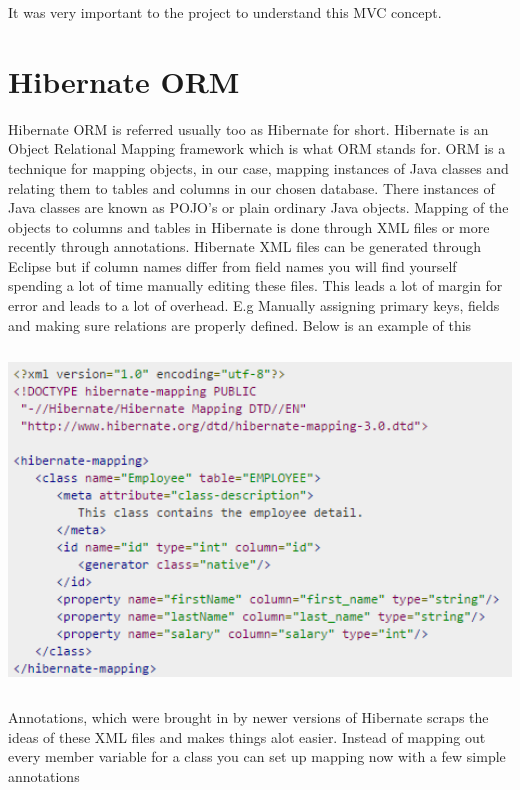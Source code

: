 \noindent It was very important to the project to understand this MVC concept.

\section{Hibernate ORM}

Hibernate ORM is referred usually too as Hibernate for short. Hibernate is an Object Relational Mapping framework which is what ORM stands for. ORM is a technique for mapping objects, in our case, mapping instances of Java classes and relating them to tables and columns in our chosen database. There instances of Java classes are known as POJO's or plain ordinary Java objects. Mapping of the objects to columns and tables in Hibernate is done through XML files or more recently through annotations. Hibernate XML files can be generated through Eclipse but if column names differ from field names you will find yourself spending a lot of time manually editing these files. This leads a lot of margin for error and leads to a lot of overhead. E.g Manually assigning primary keys, fields and making sure relations are properly defined. 
\noindent \newline \newline Below is an example of this 

\begin{center}    
	\includegraphics[height=9cm, width=14cm]{img/hibernatemapping.png}
\end{center}

Annotations, which were brought in by newer versions of Hibernate scraps the ideas of these XML files and makes things alot easier. Instead of mapping out every member variable for a class you can set up mapping now with a few simple annotations

